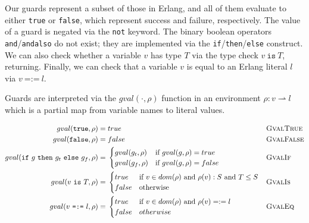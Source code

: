 \documentclass[nonacm,timestamp,manuscript]{acmart}
\newcommand{\res}[1]{\texttt{#1}}
\begin{document}
Our guards represent a subset of those in Erlang, and all of them evaluate to
either \res{true} or \res{false}, which represent success and failure,
respectively. The value of a guard is negated via the \res{not} keyword. The
binary boolean operators \res{and}/\res{andalso} do not exist; they are
implemented via the \res{if}/\res{then}/\res{else} construct. We can also check
whether a variable $v$ has type $T$ via the type check $v\ \res{is}\ T$,
returning. Finally, we can check that a variable $v$ is equal to an Erlang
literal $l$ via $v\ \res{=:=}\ l$.

\begin{definition}

\newcommand{\Gden}[2][\rho]{gval(#2,#1)} %

Guards are interpreted via the $\Gden{\cdot}$ function in an
environment $\rho : v \rightharpoonup l$ which is a partial map from variable names to literal
values.



\begin{align*}
  \Gden{\res{true}
  } ={}&
         true
  && \textsc{GvalTrue} \\
  \Gden{\res{false}
  } ={}&
         false
  && \textsc{GvalFalse} \\
  \Gden{\res{if}\ g\ \res{then}\ g_t\ \res{else}\ g_f
  } ={}&
         \begin{cases}
           \Gden{g_t} & \text{if}\ \Gden{g} = true\\
           \Gden{g_f} & \text{if}\ \Gden{g} = false
         \end{cases}
  && \textsc{GvalIf} \\
  \Gden{v\ \res{is}\ T
  } ={}&
         \begin{cases}
           true & \text{if}\ v \in dom(\rho)\ \text{and}\ \rho(v) : S\ \text{and}\ T \le S \\
           false & \text{otherwise}
         \end{cases}
  && \textsc{GvalIs} \\
  \Gden{v\ \res{=:=}\ l
  } ={}&
         \begin{cases}
           true & \text{if}\ v \in dom(\rho)\ \text{and}\ \rho(v) =:= l \\
           false & otherwise
         \end{cases}
  && \textsc{GvalEq}          
\end{align*}
\end{definition}
\end{document}
